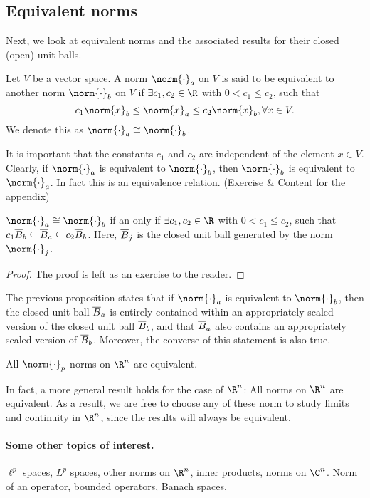 \subsection{Equivalent norms}
Next, we look at equivalent norms and the associated results for their closed (open) unit balls.
\begin{ndfn}
  Let $V$ be a vector space. A norm $\norm{\cdot}_a$ on $V$ is said to be equivalent to another norm $\norm{\cdot}_b$ on $V$ if $\exists c_1, c_2 \in \R$ with $0 < c_1 \leq c_2$, such that
  \begin{equation*}
    c_1 \norm{x}_b \leq \norm{x}_a \leq c_2 \norm{x}_b, \forall x \in V.
  \end{equation*}
  We denote this as $\norm{\cdot}_a \cong \norm{\cdot}_b$.
\end{ndfn}
It is important that the constants $c_1$ and $c_2$ are independent of the element $x \in V$. Clearly, if $\norm{\cdot}_a$ is equivalent to $\norm{\cdot}_b$, then $\norm{\cdot}_b$ is equivalent to $\norm{\cdot}_a$. In fact this is an equivalence relation. (Exercise \& Content for the appendix)


\begin{nprop}
  $\norm{\cdot}_a \cong \norm{\cdot}_b$ if an only if $\exists c_1, c_2 \in \R$ with $0 < c_1 \leq c_2$, such that $c_1 \overline{B}_b \subseteq \overline{B}_a \subseteq c_2 \overline{B}_b$. Here, $\overline{B}_j$ is the closed unit ball generated by the norm $\norm{\cdot}_j$.
\end{nprop}
\begin{proof}
  The proof is left as an exercise to the reader.
\end{proof}

The previous proposition states that if $\norm{\cdot}_a$ is equivalent to $\norm{\cdot}_b$, then the closed unit ball $\overline{B}_a$ is entirely contained within an appropriately scaled version of the closed unit ball $\overline{B}_b$, and that $\overline{B}_a$ also contains an appropriately scaled version of $\overline{B}_b$. Moreover, the converse of this statement is also true.

\begin{nthm}
  All $\norm{\cdot}_p$ norms on $\R^n$ are equivalent.
\end{nthm}

In fact, a more general result holds for the case of $\R^n$: All norms on $\R^n$ are equivalent. As a result, we are free to choose any of these norm to study limits and continuity in $\R^n$, since the results will always be equivalent.

\paragraph{Some other topics of interest.} $\ell^p$ spaces, $L^p$ spaces, other norms on $\R^n$, inner products, norms on $\C^n$. Norm of an operator, bounded operators, Banach spaces, 